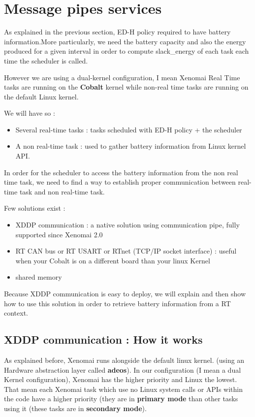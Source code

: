 \documentclass[12pt,hidelinks]{article}
\begin{document}
{\section{Message pipes services}
\vspace{4cm}
	As explained in the previous section, ED-H policy required to have battery information.More particularly, we need the battery capacity and also the energy produced for a given interval in order to compute slack\_energy of each task each time the scheduler is called.
	
	However we are using a dual-kernel configuration, I mean Xenomai Real Time tasks are running on the \textbf{Cobalt} kernel while non-real time tasks are running on the default Linux kernel.
	
	We will have so :
	\begin{itemize}
	    \item Several real-time tasks : tasks scheduled with ED-H policy + the scheduler
	    \item A non real-time task : used to gather battery information from Linux kernel API.
	\end{itemize}
	
	In order for the scheduler to access the battery information from the non real time task, we need to find a way to establish proper communication  between real-time task and non real-time task.
	
	Few solutions exist :\begin{itemize}
	    \item XDDP communication : a native solution using communication pipe, fully supported since Xenomai 2.0
	    \item RT CAN bus or RT USART or RTnet (TCP/IP socket interface) : useful when your Cobalt is on a different board than your linux Kernel
	    \item shared memory
	\end{itemize}
	
	Because XDDP communication is easy to deploy, we will explain and then show how to use this solution in order to retrieve battery information from a RT context.
	
	\subsection{XDDP communication : How it works}
	
    As explained before, Xenomai runs alongside the default linux kernel. (using an Hardware abstraction layer called \textbf{adeos}). In our configuration (I mean a dual Kernel configuration), Xenomai has the higher priority and Linux the lowest. That mean each Xenomai task which use no Linux system calls or APIs within the code have a higher priority (they are in \textbf{primary mode} than other tasks using it (these tasks are in \textbf{secondary mode}).
    
}
\end{document}
